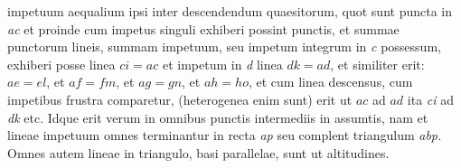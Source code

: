 \pend
\newpage
\pstart \noindent impetuum\protect{} aequalium ipsi inter descendendum quaesitorum, quot sunt puncta in \textit{ac} et proinde cum impetus\protect{} singuli exhiberi possint punctis, et summae punctorum lineis, summam impetuum\protect{}, seu impetum\protect{} integrum in \textit{c} possessum, exhiberi posse linea $ci=ac$ et impetum\protect{} in \textit{d} linea $dk=ad$, et similiter erit: $ae=el$, et $af=fm$, et $ag=gn$, et $ah=ho$, et  cum linea descensus, cum impetibus\protect{} frustra comparetur, (heterogenea enim sunt) erit ut $ac$ ad $ad$ ita \textit{ci} ad \textit{dk} etc. Idque erit verum in omnibus punctis intermediis in  assumtis, nam et lineae impetuum\protect{} omnes terminantur in recta \textit{ap} seu complent triangulum \textit{abp.} Omnes autem lineae in triangulo, basi parallelae, sunt ut altitudines.\pend 
